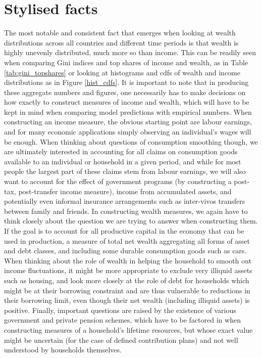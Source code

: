 \section{Stylised facts}
The most notable and consistent fact that emerges when looking at wealth
distributions across all countries and different time periods is that wealth
is highly unevenly distributed, much more so than income. This can be readily
seen when comparing Gini indices and top shares of income and wealth, as in
Table \ref{tab:gini_topshares} or looking at histograms and cdfs of wealth and
income distributions as in Figure \ref{hist_cdfs}. It is important to note
that in producing these aggregate numbers and figures, one necessarily has
to make decisions on how exactly to construct measures of income and wealth,
which will have to be kept in mind when comparing model predictions with
empirical numbers. When constructing an income measure, the obvious starting
point are labour earnings, and for many economic applications simply
observing an individual's wages will be enough. When thinking about questions
of consumption smoothing though, we are ultimately interested in accounting
for all claims on consumption goods available to an individual or household
in a given period, and while for most people the largest part of these claims
stem from labour earnings, we will also want to account for the effect of
government programs (by constructing a post-tax, post-transfer income measure),
income from accumulated assets, and potentially even informal insurance
arrangements such as inter-vivos transfers between family and friends.
In constructing wealth measures, we again have to think closely about the
question we are trying to answer when constructing them. If the goal is to
account for all productive capital in the economy that can be used in
production, a measure of total net wealth aggregating all forms of asset and
debt classes, and including some durable consumption goods such as cars. When
thinking about the role of wealth in helping the household to smooth out
income fluctuations, it might be more appropriate to exclude very illiquid
assets such as housing, and look more closely at the role of debt for households
which might be at their borrowing constraint and are thus vulnerable to
reductions in their borrowing limit, even though their net wealth (including
illiquid assets) is positive. Finally, important questions are raised by
the existence of various government and private pension schemes, which have
to be factored in when constructing measures of a household's lifetime
resources, but whose exact value might be uncertain (for the case of defined
contribution plans) and not well understood by households themselves.


